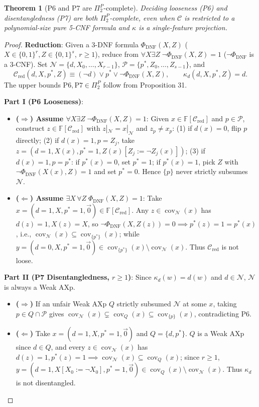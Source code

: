 \documentclass[11pt,a4paper]{article}
\newtheorem{theorem}{Theorem}[section]
\newcommand{\F}{\mathbb{F}}
\newcommand{\C}{\mathcal{C}}
\newcommand{\N}{\mathcal{N}}
\newcommand{\Prot}{\mathcal{P}}
\newcommand{\cov}{\operatorname{cov}}
\begin{document}
\begin{theorem}[P6 and P7 are $\Pi_2^P$-complete]
Deciding looseness (P6) and disentangledness (P7) are both $\Pi_2^P$-complete, even when $\C$ is restricted to a polynomial-size pure 5-CNF formula and $\kappa$ is a single-feature projection.
\end{theorem}
\begin{proof}
\textbf{Reduction}: Given a 3-DNF formula $\Phi_{\mathrm{DNF}}(X, Z)$ ($X \in \{0,1\}^r, Z \in \{0,1\}^s$, $r \ge 1$), reduce from $\forall X\exists Z\;\neg\Phi_{\mathrm{DNF}}(X,Z)=1$ ($\neg\Phi_{\mathrm{DNF}}$ is a 3-CNF). Set $\N = \{d, X_0, \dots, X_{r-1}\}$, $\Prot = \{p^*, Z_0, \dots, Z_{s-1}\}$, and
\[
  \C_{\mathrm{red}}(d, X, p^*, Z) \equiv (\neg d) \lor p^* \lor \neg\Phi_{\mathrm{DNF}}(X, Z), \qquad \kappa_d(d, X, p^*, Z) = d.
\]
The upper bounds $\mathrm{P6, P7} \in \Pi_2^P$ follow from Proposition 31.

\textbf{Part I (P6 Looseness)}:
\begin{itemize}
  \item \textbf{($\Rightarrow$) Assume $\forall X\exists Z\;\neg\Phi_{\mathrm{DNF}}(X,Z)=1$}: Given $x \in \F[\C_{\mathrm{red}}]$ and $p \in \Prot$, construct $z \in \F[\C_{\mathrm{red}}]$ with $z|_{\N}=x|_{\N}$ and $z_p \ne x_p$:
  (1) if $d(x)=0$, flip $p$ directly;
  (2) if $d(x)=1, p=Z_j$, take $z=(d=1, X(x), p^*=1, Z(x)[Z_j:=\neg Z_j(x)])$;
  (3) if $d(x)=1, p=p^*$: if $p^*(x)=0$, set $p^*=1$; if $p^*(x)=1$, pick $Z$ with $\neg\Phi_{\mathrm{DNF}}(X(x), Z)=1$ and set $p^*=0$. Hence $\{p\}$ never strictly subsumes $\N$.
  \item \textbf{($\Leftarrow$) Assume $\exists X\,\forall Z\;\Phi_{\mathrm{DNF}}(X,Z)=1$}: Take $x = (d=1, X, p^*=1, \vec{0}) \in \F[\C_{\mathrm{red}}]$. Any $z \in \cov_{\N}(x)$ has $d(z)=1, X(z)=X$, so $\neg\Phi_{\mathrm{DNF}}(X,Z(z))=0 \implies p^*(z)=1=p^*(x)$, i.e., $\cov_{\N}(x) \subseteq \cov_{\{p^*\}}(x)$; while $y=(d=0, X, p^*=1, \vec{0}) \in \cov_{\{p^*\}}(x) \setminus \cov_{\N}(x)$. Thus $\C_{\mathrm{red}}$ is not loose.
\end{itemize}

\textbf{Part II (P7 Disentangledness, $r \ge 1$)}: Since $\kappa_d(w)=d(w)$ and $d \in \N$, $\N$ is always a Weak AXp.
\begin{itemize}
  \item \textbf{($\Rightarrow$)} If an unfair Weak AXp $Q$ strictly subsumed $\N$ at some $x$, taking $p \in Q \cap \Prot$ gives $\cov_{\N}(x) \subsetneq \cov_Q(x) \subseteq \cov_{\{p\}}(x)$, contradicting P6.
  \item \textbf{($\Leftarrow$)} Take $x=(d=1, X, p^*=1, \vec{0})$ and $Q=\{d, p^*\}$. $Q$ is a Weak AXp since $d \in Q$, and every $z \in \cov_{\N}(x)$ has $d(z)=1, p^*(z)=1 \implies \cov_{\N}(x) \subseteq \cov_Q(x)$; since $r \ge 1$, $y=(d=1, X[X_0:=\neg X_0], p^*=1, \vec{0}) \in \cov_Q(x) \setminus \cov_{\N}(x)$. Thus $\kappa_d$ is not disentangled.
\end{itemize}
\end{proof}
\end{document}
